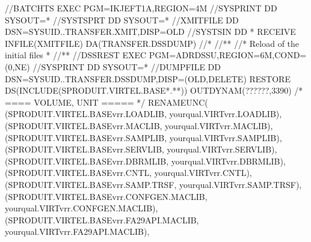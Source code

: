 \documentclass[letterpaper,10pt,english]{sphinxmanual}
\begin{document}
\begin{sphinxVerbatim}[commandchars=\\\{\}]
//BATCHTS EXEC PGM=IKJEFT1A,REGION=4M
//SYSPRINT DD SYSOUT=*
//SYSTSPRT DD SYSOUT=*
//XMITFILE DD DSN=\PYGZam{}SYSUID..TRANSFER.XMIT,DISP=OLD
//SYSTSIN DD *
RECEIVE INFILE(XMITFILE) DA(TRANSFER.DSSDUMP)
//*
//*\PYGZhy{}\PYGZhy{}\PYGZhy{}\PYGZhy{}\PYGZhy{}\PYGZhy{}\PYGZhy{}\PYGZhy{}\PYGZhy{}\PYGZhy{}\PYGZhy{}\PYGZhy{}\PYGZhy{}\PYGZhy{}\PYGZhy{}\PYGZhy{}\PYGZhy{}\PYGZhy{}\PYGZhy{}\PYGZhy{}\PYGZhy{}\PYGZhy{}\PYGZhy{}\PYGZhy{}\PYGZhy{}\PYGZhy{}\PYGZhy{}\PYGZhy{}\PYGZhy{}\PYGZhy{}\PYGZhy{}\PYGZhy{}\PYGZhy{}\PYGZhy{}\PYGZhy{}\PYGZhy{}\PYGZhy{}\PYGZhy{}\PYGZhy{}\PYGZhy{}\PYGZhy{}\PYGZhy{}\PYGZhy{}\PYGZhy{}\PYGZhy{}\PYGZhy{}\PYGZhy{}\PYGZhy{}\PYGZhy{}\PYGZhy{}\PYGZhy{}\PYGZhy{}\PYGZhy{}\PYGZhy{}\PYGZhy{}\PYGZhy{}\PYGZhy{}\PYGZhy{}\PYGZhy{}\PYGZhy{}\PYGZhy{}\PYGZhy{}\PYGZhy{}\PYGZhy{}\PYGZhy{}\PYGZhy{}\PYGZhy{}*
//* Reload of the initial files *
//*\PYGZhy{}\PYGZhy{}\PYGZhy{}\PYGZhy{}\PYGZhy{}\PYGZhy{}\PYGZhy{}\PYGZhy{}\PYGZhy{}\PYGZhy{}\PYGZhy{}\PYGZhy{}\PYGZhy{}\PYGZhy{}\PYGZhy{}\PYGZhy{}\PYGZhy{}\PYGZhy{}\PYGZhy{}\PYGZhy{}\PYGZhy{}\PYGZhy{}\PYGZhy{}\PYGZhy{}\PYGZhy{}\PYGZhy{}\PYGZhy{}\PYGZhy{}\PYGZhy{}\PYGZhy{}\PYGZhy{}\PYGZhy{}\PYGZhy{}\PYGZhy{}\PYGZhy{}\PYGZhy{}\PYGZhy{}\PYGZhy{}\PYGZhy{}\PYGZhy{}\PYGZhy{}\PYGZhy{}\PYGZhy{}\PYGZhy{}\PYGZhy{}\PYGZhy{}\PYGZhy{}\PYGZhy{}\PYGZhy{}\PYGZhy{}\PYGZhy{}\PYGZhy{}\PYGZhy{}\PYGZhy{}\PYGZhy{}\PYGZhy{}\PYGZhy{}\PYGZhy{}\PYGZhy{}\PYGZhy{}\PYGZhy{}\PYGZhy{}\PYGZhy{}\PYGZhy{}\PYGZhy{}\PYGZhy{}\PYGZhy{}*
//DSSREST EXEC PGM=ADRDSSU,REGION=6M,COND=(0,NE)
//SYSPRINT DD SYSOUT=*
//DUMPFILE DD DSN=\PYGZam{}SYSUID..TRANSFER.DSSDUMP,DISP=(OLD,DELETE)
RESTORE \PYGZhy{}
DS(INCLUDE(SPRODUIT.VIRTEL.BASE*.**)) \PYGZhy{}
OUTDYNAM(??????,3390) /* \PYGZlt{}==== VOLUME, UNIT ===== */ \PYGZhy{}
RENAMEUNC( \PYGZhy{}
    (SPRODUIT.VIRTEL.BASEvrr.LOADLIB, \PYGZhy{}
            yourqual.VIRTvrr.LOADLIB), \PYGZhy{}
    (SPRODUIT.VIRTEL.BASEvrr.MACLIB, \PYGZhy{}
            yourqual.VIRTvrr.MACLIB), \PYGZhy{}
    (SPRODUIT.VIRTEL.BASEvrr.SAMPLIB, \PYGZhy{}
            yourqual.VIRTvrr.SAMPLIB), \PYGZhy{}
    (SPRODUIT.VIRTEL.BASEvrr.SERVLIB, \PYGZhy{}
            yourqual.VIRTvrr.SERVLIB), \PYGZhy{}
    (SPRODUIT.VIRTEL.BASEvrr.DBRMLIB, \PYGZhy{}
            yourqual.VIRTvrr.DBRMLIB), \PYGZhy{}
    (SPRODUIT.VIRTEL.BASEvrr.CNTL, \PYGZhy{}
            yourqual.VIRTvrr.CNTL), \PYGZhy{}
    (SPRODUIT.VIRTEL.BASEvrr.SAMP.TRSF, \PYGZhy{}
            yourqual.VIRTvrr.SAMP.TRSF), \PYGZhy{}
    (SPRODUIT.VIRTEL.BASEvrr.CONFGEN.MACLIB, \PYGZhy{}
            yourqual.VIRTvrr.CONFGEN.MACLIB), \PYGZhy{}
    (SPRODUIT.VIRTEL.BASEvrr.FA29API.MACLIB, \PYGZhy{}
            yourqual.VIRTvrr.FA29API.MACLIB), \PYGZhy{}

\end{sphinxVerbatim}
\end{document}
